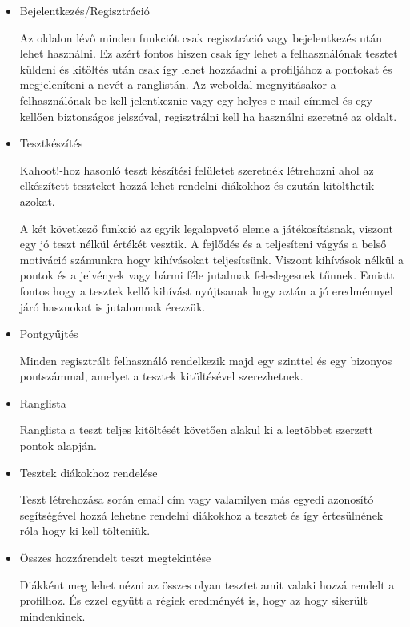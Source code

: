 
\begin{itemize}
    \item {Bejelentkezés/Regisztráció}
          \begin{addmargin}[\parindent]{0pt}
              Az oldalon lévő minden funkciót csak regisztráció vagy bejelentkezés után lehet használni. Ez azért fontos hiszen csak így lehet a felhasználónak tesztet küldeni és kitöltés után csak így lehet hozzáadni a profiljához a pontokat és megjeleníteni a nevét a ranglistán. Az weboldal megnyitásakor a felhasználónak be kell jelentkeznie vagy egy helyes e-mail címmel és egy kellően biztonságos jelszóval, regisztrálni kell ha használni szeretné az oldalt.
          \end{addmargin}
    \item {Tesztkészítés}
          \begin{addmargin}[\parindent]{0pt}
              Kahoot!-hoz hasonló teszt készítési felületet szeretnék létrehozni ahol az elkészített teszteket hozzá lehet rendelni diákokhoz és ezután kitölthetik azokat.

              A két következő funkció az egyik legalapvető eleme a játékosításnak, viszont egy jó teszt nélkül értékét vesztik. A fejlődés és a teljesíteni vágyás a belső motiváció számunkra hogy kihívásokat teljesítsünk. Viszont kihívások nélkül a pontok és a jelvények vagy bármi féle jutalmak feleslegesnek tűnnek. Emiatt fontos hogy a tesztek kellő kihívást nyújtsanak hogy aztán a jó eredménnyel járó hasznokat is jutalomnak érezzük.
          \end{addmargin}
    \item {Pontgyűjtés}
          \begin{addmargin}[\parindent]{0pt}
              Minden regisztrált felhasználó rendelkezik majd egy szinttel és egy bizonyos pontszámmal, amelyet a tesztek kitöltésével szerezhetnek.
          \end{addmargin}
    \item {Ranglista}
          \begin{addmargin}[\parindent]{0pt}
              Ranglista a teszt teljes kitöltését követően alakul ki a legtöbbet szerzett pontok alapján.
          \end{addmargin}
    \item {Tesztek diákokhoz rendelése}
          \begin{addmargin}[\parindent]{0pt}
              Teszt létrehozása során email cím vagy valamilyen más egyedi azonosító segítségével hozzá lehetne rendelni diákokhoz a tesztet és így értesülnének róla hogy ki kell tölteniük.
          \end{addmargin}
    \item {Összes hozzárendelt teszt megtekintése}
          \begin{addmargin}[\parindent]{0pt}
              Diákként meg lehet nézni az összes olyan tesztet amit valaki hozzá rendelt a profilhoz. És ezzel együtt a régiek eredményét is, hogy az hogy sikerült mindenkinek.
          \end{addmargin}
\end{itemize}

